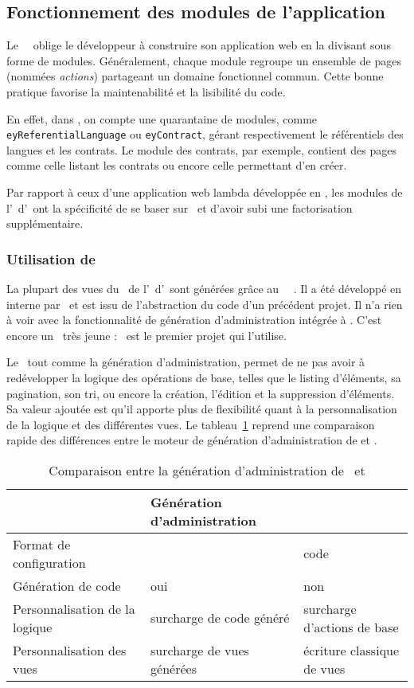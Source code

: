 \subsection{Fonctionnement des modules de l'application}
\label{section:eyrolles_modules}

Le \afm\ \asf\ oblige le développeur à construire son application web en la divisant sous forme de modules. Généralement, chaque module regroupe un ensemble de pages (nommées \emph{actions}) partageant un domaine fonctionnel commun. Cette bonne pratique favorise la maintenabilité et la lisibilité du code.

En effet, dans \aey, on compte une quarantaine de modules, comme \texttt{ey\-Referential\-Language} ou \texttt{eyContract}, gérant respectivement le référentiels des langues et les contrats. Le module des contrats, par exemple, contient des pages comme celle listant les contrats ou encore celle permettant d'en créer.

Par rapport à ceux d'une application web lambda développée en \asf, les modules de l'\aintranet\ d'\aey\ ont la spécificité de se baser sur \asladmin\ et d'avoir subi une factorisation supplémentaire.


\subsubsection{Utilisation de \asladmin}

La plupart des vues du \alotdeux\ de l'\aintranet\ d'\aey\ sont générées grâce au \aplugin\ \asf\ \asladmin. Il a été développé en interne par \asl\ et est issu de l'abstraction du code d'un précédent projet. Il n'a rien à voir avec la fonctionnalité de génération d'administration intégrée à \asf. C'est encore un \aplugin\ très jeune : \aey\ est le premier projet qui l'utilise.

Le \aplugin\, tout comme la génération d'administration, permet de ne pas avoir à redévelopper la logique des opérations de base, telles que le listing d'éléments, sa pagination, son tri, ou encore la création, l'édition et la suppression d'éléments. Sa valeur ajoutée est qu'il apporte plus de flexibilité quant à la personnalisation de la logique et des différentes vues. Le tableau~\ref{table:eyrolles_sladmin_sladmin-vs-admin-gen} reprend une comparaison rapide des différences entre le moteur de génération d'administration de \asf et \asladmin.

\begin{table}
	\centering
	\begin{tabular}{|p{3cm}||p{4.5cm}|p{4.5cm}|}
		\hline
		& Génération d'administration & \asladmin\ \tabularnewline
		\hline
		\hline
		Format de configuration & \ayml & code \aphp \tabularnewline
		\hline
		Génération de code & oui & non \tabularnewline
		\hline
		Personnalisation de la logique & surcharge de code généré & surcharge d'actions de base \tabularnewline
		\hline
		Personnalisation des vues & surcharge de vues générées & écriture classique de vues \tabularnewline
		\hline
	\end{tabular}
	\caption{Comparaison entre la génération d'administration de \asf\ et \asladmin}
	\label{table:eyrolles_sladmin_sladmin-vs-admin-gen}
\end{table}

